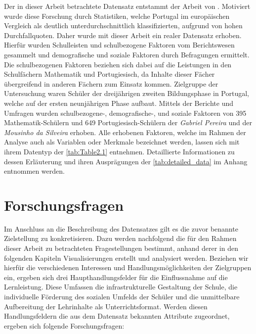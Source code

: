 Der in dieser Arbeit betrachtete Datensatz entstammt der Arbeit von \cite[]{Cortez2008UsingDM}.
Motiviert wurde diese Forschung durch Statistiken, welche Portugal im europäischen Vergleich als deutlich unterdurchschnittlich klassifizierten, aufgrund von hohen Durchfallquoten. \cite[S. 1]{Cortez2008UsingDM}
Daher wurde mit dieser Arbeit ein realer Datensatz erhoben.
Hierfür wurden Schulleisten und schulbezogene Faktoren vom Berichtswesen gesammelt und demografische und soziale Faktoren durch Befragungen ermittelt. \cite[S. 1]{Cortez2008UsingDM}
Die schulbezogenen Faktoren beziehen sich dabei auf die Leistungen in den Schulfächern Mathematik und Portugiesisch, da Inhalte dieser Fächer übergreifend in anderen Fächern zum Einsatz kommen. \cite[S. 2]{Cortez2008UsingDM}
Zielgruppe der Untersuchung waren Schüler der dreijährigen zweiten Bildungsphase in Portugal, welche auf der ersten neunjährigen Phase aufbaut. \cite[S. 2]{Cortez2008UsingDM}
Mittels der Berichte und Umfragen wurden schulbezogene-, demografische-, und soziale Faktoren von 395 Mathematik-Schülern und 649 Portugiesisch-Schülern der \textit{Gabriel Pereira} und der \textit{Mousinho da Silveira} erhoben.
Alle erhobenen Faktoren, welche im Rahmen der Analyse auch als Variablen oder Merkmale bezeichnet werden, lassen sich mit ihrem Datentyp der \autoref{tab:Table2.1} entnehmen. 
Detaillierte Informationen zu dessen Erläuterung und ihren Ausprägungen der \autoref{tab:detailed_data} im Anhang entnommen werden.





\section[Forschungsfragen]{Forschungsfragen}

Im Anschluss an die Beschreibung des Datensatzes gilt es die zuvor benannte Zielstellung zu konkretisieren. 
Dazu werden nachfolgend die für den Rahmen dieser Arbeit zu betrachteten Fragestellungen bestimmt, anhand derer in den folgenden Kapiteln Visualisierungen erstellt und analysiert werden.
Beziehen wir hierfür die verschiedenen Interessen und Handlungsmöglichkeiten der Zielgruppen ein, ergeben sich drei Haupthandlungsfelder für die Einflussnahme auf die Lernleistung.
Diese Umfassen die infrastrukturelle Gestaltung der Schule, die individuelle Förderung des sozialen Umfelds der Schüler und die unmittelbare Aufbereitung der Lehrinhalte als Unterrichtsformat.
Werden diesen Handlungsfeldern die aus dem Datensatz bekannten Attribute zugeordnet, ergeben sich folgende Forschungsfragen:

